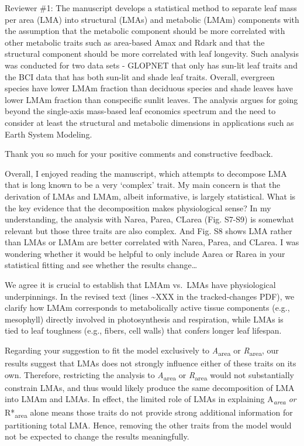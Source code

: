 \documentclass[
  12pt,
  letterpaper,
  DIV=11,
  numbers=noendperiod]{scrartcl}
\renewenvironment{quote}
  {\begin{customblockquote}\color{blockquote-text}\ignorespaces}
  {\end{customblockquote}}
\begin{document}
\begin{quote}
Reviewer \#1: The manuscript develops a statistical method to separate
leaf mass per area (LMA) into structural (LMAs) and metabolic (LMAm)
components with the assumption that the metabolic component should be
more correlated with other metabolic traits such as area-based Amax and
Rdark and that the structural component should be more correlated with
leaf longevity. Such analysis was conducted for two data sets - GLOPNET
that only has sun-lit leaf traits and the BCI data that has both sun-lit
and shade leaf traits. Overall, evergreen species have lower LMAm
fraction than deciduous species and shade leaves have lower LMAm
fraction than conspecific sunlit leaves. The analysis argues for going
beyond the single-axis mass-based leaf economics spectrum and the need
to consider at least the structural and metabolic dimensions in
applications such as Earth System Modeling.
\end{quote}

Thank you so much for your positive comments and constructive feedback.

\begin{quote}
Overall, I enjoyed reading the manuscript, which attempts to decompose
LMA that is long known to be a very `complex' trait. My main concern is
that the derivation of LMAs and LMAm, albeit informative, is largely
statistical. What is the key evidence that the decomposition makes
physiological sense? In my understanding, the analysis with Narea,
Parea, CLarea (Fig. S7-S9) is somewhat relevant but those three traits
are also complex. And Fig. S8 shows LMA rather than LMAs or LMAm are
better correlated with Narea, Parea, and CLarea. I was wondering whether
it would be helpful to only include Aarea or Rarea in your statistical
fitting and see whether the results change\ldots{}
\end{quote}

We agree it is crucial to establish that LMAm vs.~LMAs have
physiological underpinnings. In the revised text (lines
\textasciitilde XXX in the tracked‐changes PDF), we clarify how LMAm
corresponds to metabolically active tissue components (e.g., mesophyll)
directly involved in photosynthesis and respiration, while LMAs is tied
to leaf toughness (e.g., fibers, cell walls) that confers longer leaf
lifespan.

Regarding your suggestion to fit the model exclusively to
\emph{A}\textsubscript{area} or \emph{R}\textsubscript{area}, our
results suggest that LMAs does not strongly influence either of these
traits on its own. Therefore, restricting the analysis to
\emph{A}\textsubscript{area} or \emph{R}\textsubscript{area} would not
substantially constrain LMAs, and thus would likely produce the same
decomposition of LMA into LMAm and LMAs. In effect, the limited role of
LMAs in explaining A\emph{\textsubscript{area} or
}R*\textsubscript{area} alone means those traits do not provide strong
additional information for partitioning total LMA. Hence, removing the
other traits from the model would not be expected to change the results
meaningfully.
\end{document}
